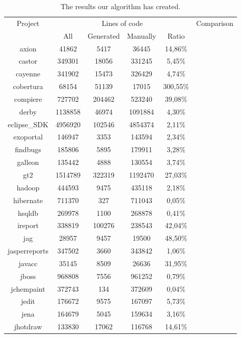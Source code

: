 \setlength{\extrarowheight}{-.1em}
\begin{table}
	\caption{The results our algorithm has created.}
	\label{table:locQualitasCorpus}
	\begin{tabularx}{\textwidth}{c|c|c|c|c|c}
		Project & \multicolumn{4}{c|}{Lines of code} & Comparison \\
		& All & Generated & Manually & Ratio & \\
		\hline
		axion & 41862 & 5417 & 36445 & 14,86\%  & \\
		castor & 349301 & 18056 & 331245 & 5,45\%  & \\
		cayenne & 341902 & 15473 & 326429 & 4,74\%  & \\
		cobertura & 68154 & 51139 & 17015 & 300,55\%  & \\
		compiere & 727702 & 204462 & 523240 & 39,08\%  & \\
		derby & 1138858 & 46974 & 1091884 & 4,30\%  & \\
		eclipse\_SDK & 4956920 & 102546 & 4854374 & 2,11\%  & \\
		exoportal & 146947 & 3353 & 143594 & 2,34\%  & \\
		findbugs & 185806 & 5895 & 179911 & 3,28\%  & \\
		galleon & 135442 & 4888 & 130554 & 3,74\%  & \\
		gt2 & 1514789 & 322319 & 1192470 & 27,03\%  & \\
		hadoop & 444593 & 9475 & 435118 & 2,18\%  & \\
		hibernate & 711370 & 327 & 711043 & 0,05\%  & \\
		hsqldb & 269978 & 1100 & 268878 & 0,41\%  & \\
		ireport & 338819 & 100276 & 238543 & 42,04\%  & \\
		jag & 28957 & 9457 & 19500 & 48,50\%  & \\
		jasperreports & 347502 & 3660 & 343842 & 1,06\%  & \\
		javacc & 35145 & 8509 & 26636 & 31,95\%  & \\
		jboss & 968808 & 7556 & 961252 & 0,79\%  & \\
		jchempaint & 372743 & 134 & 372609 & 0,04\%  & \\
		jedit & 176672 & 9575 & 167097 & 5,73\%  & \\
		jena & 164679 & 5045 & 159634 & 3,16\%  & \\
		jhotdraw & 133830 & 17062 & 116768 & 14,61\%  & \\

\end{tabularx}
\end{table}
